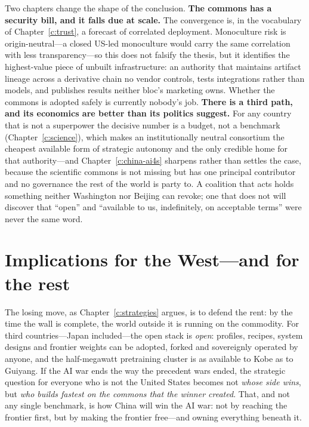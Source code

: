 Two chapters change the shape of the conclusion. \textbf{The commons has a security bill, and it falls due at scale.} The convergence is, in the vocabulary of Chapter~\ref{c:trust}, a forecast of correlated deployment. Monoculture risk is origin-neutral---a closed US-led monoculture would carry the same correlation with less transparency---so this does not falsify the thesis, but it identifies the highest-value piece of unbuilt infrastructure: an authority that maintains artifact lineage across a derivative chain no vendor controls, tests integrations rather than models, and publishes results neither bloc's marketing owns. Whether the commons is adopted safely is currently nobody's job. \textbf{There is a third path, and its economics are better than its politics suggest.} For any country that is not a superpower the decisive number is a budget, not a benchmark (Chapter~\ref{c:science}), which makes an institutionally neutral consortium the cheapest available form of strategic autonomy and the only credible home for that authority---and Chapter~\ref{c:china-ai4s} sharpens rather than settles the case, because the scientific commons is not missing but has one principal contributor and no governance the rest of the world is party to. A coalition that acts holds something neither Washington nor Beijing can revoke; one that does not will discover that ``open'' and ``available to us, indefinitely, on acceptable terms'' were never the same word.

\section{Implications for the West---and for the rest}

The losing move, as Chapter~\ref{c:strategies} argues, is to defend the rent: by the time the wall is complete, the world outside it is running on the commodity. For third countries---Japan included---the open stack is \emph{open}: profiles, recipes, system designs and frontier weights can be adopted, forked and sovereignly operated by anyone, and the half-megawatt pretraining cluster is as available to Kobe as to Guiyang. If the AI war ends the way the precedent wars ended, the strategic question for everyone who is not the United States becomes not \emph{whose side wins}, but \emph{who builds fastest on the commons that the winner created}. That, and not any single benchmark, is how China will win the AI war: not by reaching the frontier first, but by making the frontier free---and owning everything beneath it.
